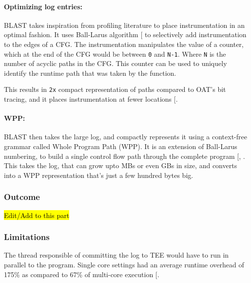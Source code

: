 \documentclass[a4paper, nobind]{templates/ociamthesis}
\begin{document}
\paragraph{Optimizing log entries:}\label{optimizing-log-entries}

BLAST takes inspiration from profiling literature to place instrumentation in
an optimal fashion. It uses Ball-Larus algorithm {[}\citeproc{ref-balllarus}{17}{]} to selectively
add instrumentation to the edges of a CFG. The instrumentation manipulates the value of a counter,
which at the end of the CFG would be between \texttt{0} and \texttt{N-1}. Where \texttt{N} is the number
of acyclic paths in the CFG. This counter can be used to uniquely identify the
runtime path that was taken by the function.

This results in \texttt{2x} compact representation of paths compared to OAT's bit tracing,
and it places instrumentation at fewer locations {[}\citeproc{ref-blast}{55}{]}.

\paragraph{WPP:}\label{wpp}

BLAST then takes the large log, and compactly represents it using a context-free
grammar called Whole Program Path (WPP). It is an extension of Ball-Larus numbering, to build a single
control flow path through the complete program {[}, \citeproc{ref-blast}{55}{]}.
This takes the log, that can grow upto MBs or even GBs in size, and converts into
a WPP representation that's just a few hundred bytes big.

\subsubsection{Outcome}\label{outcome}

\hl{Edit/Add to this part}

\subsubsection{Limitations}\label{limitations}

The thread responsible of committing the log to TEE would have to run in parallel
to the program. Single core settings had an average runtime overhead of 175\%
as compared to 67\% of multi-core execution {[}\citeproc{ref-blast}{55}{]}.
\end{document}
